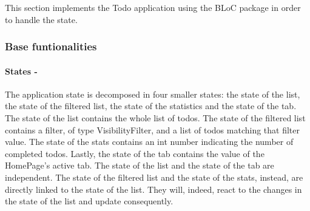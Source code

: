 This section implements the Todo application using the BLoC package in order to handle the state. 
\subsubsection{Base funtionalities}  \label{par:todo_app_inherited_widget_introduction}

\paragraph{States - }
\label{subpar:todo_app_bloc_core_state}
The application state is decomposed in four smaller states: the state of the list, the state of the filtered list, the state of the statistics and the state of the tab. The state of the list contains the whole list of todos. The state of the filtered list contains a filter, of type VisibilityFilter, and a list of todos matching that filter value. The state of the stats contains an int number indicating the number of completed todos. Lastly, the state of the tab contains the value of the HomePage’s active tab. The state of the list and the state of the tab are independent. The state of the filtered list and the state of the stats,  instead, are directly linked to the state of the list. They will,  indeed, react to the changes in the state of the list and update consequently. 

